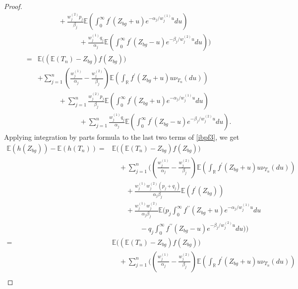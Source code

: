 \documentclass[12pt, a4paper,reqno]{amsart}
\theoremstyle{definition}
\theoremstyle{myremark}
\numberwithin{equation}{section}
\begin{document}
\begin{proof}
\begin{align}
	\nonumber&\quad\quad\quad+\frac{w_{j}^{(2)}p_j}{\beta_j}\mathbb{E} \left(\displaystyle\int_{0}^{\infty}f^{\prime}(Z_{bg}+u)e^{-\alpha_j/w_{j}^{(1)} u} du \right)\\
	\nonumber&\quad\quad\quad\quad\quad\quad+\frac{w_{j}^{(1)}q_j}{\alpha_j}\mathbb{E} \left(\displaystyle\int_{0}^{\infty}f^{\prime}(Z_{bg}-u)e^{-\beta_j/w_{j}^{(2)} u} du \right)\bigg)\\
	\nonumber=&\mathbb{E} \bigg(\left(  \mathbb{E}(T_n) -Z_{bg} \right)f(Z_{bg})\bigg)\\
\nonumber	&+\sum_{j=1}^{n}\left(\frac{w_{j}^{(1)} }{\alpha_j}-\frac{w_{j}^{(2)}}{\beta_j} \right)\mathbb{E} \left( \int_{\mathbb{R}} f^{\prime}(Z_{bg}+u) u\nu_{T_n}(du) \right)\\
	\nonumber&\quad\quad\quad+\sum_{j=1}^{n}\frac{w_{j}^{(2)}p_j}{\beta_j}\mathbb{E} \left(\displaystyle\int_{0}^{\infty}f^{\prime}(Z_{bg}+u)e^{-\alpha_j/w_{j}^{(1)} u} du \right)\\
	\label{ibpf3}&\quad\quad\quad\quad\quad\quad+\sum_{j=1}^{n}\frac{w_{j}^{(1)}q_j}{\alpha_j}\mathbb{E} \left(\displaystyle\int_{0}^{\infty}f^{\prime}(Z_{bg}-u)e^{-\beta_j/w_{j}^{(2)} u} du \right).
	\end{align}
	\noindent
	Applying integration by parts formula to the last two terms of \eqref{ibpf3}, we get	
	\begin{align}
	\nonumber\mathbb{E}(h(Z_{bg}))-\mathbb{E}(h(T_n))=&\mathbb{E} \bigg(\left(  \mathbb{E}(T_n) -Z_{bg} \right)f(Z_{bg})\bigg)\\
\nonumber	&\quad+\sum_{j=1}^{n}\bigg(\left(\frac{w_{j}^{(1)} }{\alpha_j}-\frac{w_{j}^{(2)}}{\beta_j} \right)\mathbb{E} \left( \int_{\mathbb{R}} f^{\prime}(Z_{bg}+u) u\nu_{T_n}(du) \right)\\
	\nonumber&\quad\quad+\frac{w_{j}^{(1)}w_{j}^{(2)}(p_j+q_j)}{\alpha_j \beta_j}\mathbb{E}\left(f^{\prime}(Z_{bg}) \right)\\
	\nonumber&\quad\quad+	\frac{w_{j}^{(1)}w_{j}^{(2)}}{\alpha_j \beta_j}\mathbb{E}\bigg(p_j \int_{0}^{\infty}f^{\prime\prime}(Z_{bg}+u)e^{-\alpha_j/w_{j}^{(1)} u}du\\
	\nonumber&\quad\quad\quad\quad-q_j\int_{0}^{\infty}f^{\prime\prime}(Z_{bg}-u)e^{-\beta_j/w_{j}^{(2)} u}du\bigg)\bigg)\\
	\nonumber =&\mathbb{E} \bigg(\left(  \mathbb{E}(T_n) -Z_{bg} \right)f(Z_{bg})\bigg)\\
	\nonumber	&\quad+\sum_{j=1}^{n}\bigg(\left(\frac{w_{j}^{(1)} }{\alpha_j}-\frac{w_{j}^{(2)}}{\beta_j} \right)\mathbb{E} \left( \int_{\mathbb{R}} f^{\prime}(Z_{bg}+u) u\nu_{T_n}(du) \right)\\

\end{align}
\end{proof}
\end{document}
